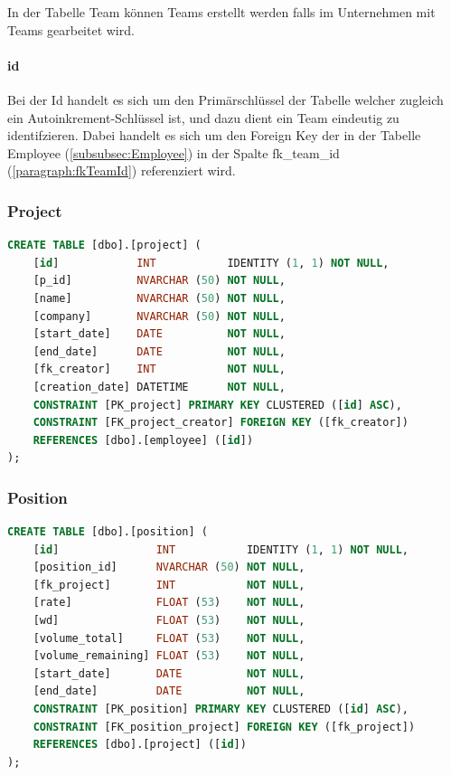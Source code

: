 \documentclass{article}
\begin{document}
         In der Tabelle Team können Teams erstellt werden falls im Unternehmen mit Teams gearbeitet wird.
\paragraph{id} Bei der Id handelt es sich um den Primärschlüssel der Tabelle welcher zugleich
ein Autoinkrement-Schlüssel ist, und dazu dient ein Team eindeutig zu
identifzieren. Dabei handelt es sich um den Foreign Key der in der Tabelle Employee (\ref{subsubsec:Employee}) in der Spalte fk\_team\_id (\ref{paragraph:fkTeamId}) referenziert wird.
\subsubsection{Project}
\begin{lstlisting}[language=Sql, caption= Create Table Statement für Project Table]
    CREATE TABLE [dbo].[project] (
    [id]            INT           IDENTITY (1, 1) NOT NULL,
    [p_id]          NVARCHAR (50) NOT NULL,
    [name]          NVARCHAR (50) NOT NULL,
    [company]       NVARCHAR (50) NOT NULL,
    [start_date]    DATE          NOT NULL,
    [end_date]      DATE          NOT NULL,
    [fk_creator]    INT           NOT NULL,
    [creation_date] DATETIME      NOT NULL,
    CONSTRAINT [PK_project] PRIMARY KEY CLUSTERED ([id] ASC),
    CONSTRAINT [FK_project_creator] FOREIGN KEY ([fk_creator]) 
    REFERENCES [dbo].[employee] ([id])
);
         \end{lstlisting}
\subsubsection{Position}
\begin{lstlisting}[language=Sql, caption= Create Table Statement für Position Table]
    CREATE TABLE [dbo].[position] (
    [id]               INT           IDENTITY (1, 1) NOT NULL,
    [position_id]      NVARCHAR (50) NOT NULL,
    [fk_project]       INT           NOT NULL,
    [rate]             FLOAT (53)    NOT NULL,
    [wd]               FLOAT (53)    NOT NULL,
    [volume_total]     FLOAT (53)    NOT NULL,
    [volume_remaining] FLOAT (53)    NOT NULL,
    [start_date]       DATE          NOT NULL,
    [end_date]         DATE          NOT NULL,
    CONSTRAINT [PK_position] PRIMARY KEY CLUSTERED ([id] ASC),
    CONSTRAINT [FK_position_project] FOREIGN KEY ([fk_project]) 
    REFERENCES [dbo].[project] ([id])
);
         \end{lstlisting}
\end{document}
